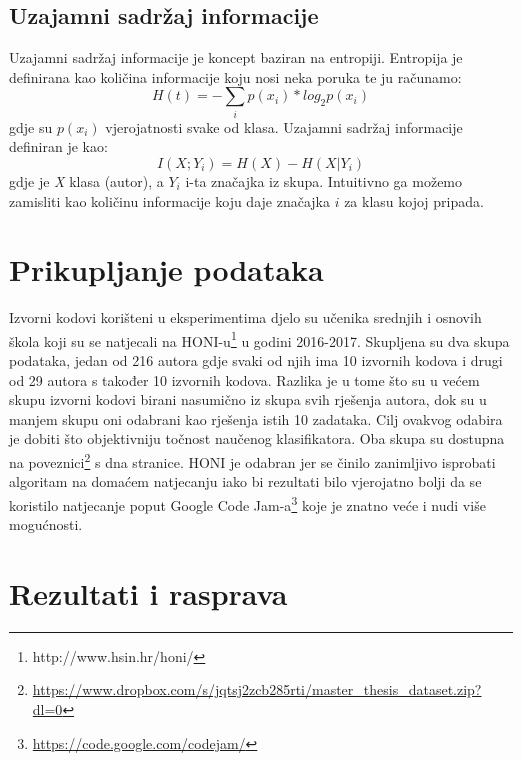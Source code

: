 \subsection{Uzajamni sadržaj informacije} \label{entropy}

Uzajamni sadržaj informacije je koncept baziran na entropiji. Entropija je definirana kao količina informacije koju nosi neka poruka te ju računamo:
\begin{equation}
		H(t) = - \sum_{i} p(x_{i}) * log_2 p(x_{i})
\end{equation}
gdje su $p(x_{i})$ vjerojatnosti svake od klasa. \newline
Uzajamni sadržaj informacije definiran je kao:
\begin{equation}
		I(X;Y_{i}) = H(X) - H(X | Y_{i})
\end{equation}
gdje je \textit{X} klasa (autor), a $Y_{i}$ i-ta značajka iz skupa. Intuitivno ga možemo zamisliti kao količinu informacije koju daje značajka $i$ za klasu kojoj pripada.

\section{Prikupljanje podataka}
Izvorni kodovi korišteni u eksperimentima djelo su učenika srednjih i osnovih škola koji su se natjecali na HONI-u\footnote{http://www.hsin.hr/honi/} u godini 2016-2017. Skupljena su dva skupa podataka, jedan od 216 autora gdje svaki od njih ima 10 izvornih kodova i drugi od 29 autora s također 10 izvornih kodova. Razlika je u tome što su u većem skupu izvorni kodovi birani nasumično iz skupa svih rješenja autora, dok su u manjem skupu oni odabrani kao rješenja istih 10 zadataka. Cilj ovakvog odabira  je dobiti što objektivniju točnost naučenog klasifikatora. Oba skupa su dostupna na poveznici\footnote{\url{https://www.dropbox.com/s/jqtsj2zcb285rti/master_thesis_dataset.zip?dl=0}} s dna stranice. HONI je odabran jer se činilo zanimljivo isprobati algoritam na domaćem natjecanju iako bi rezultati bilo vjerojatno bolji da se koristilo natjecanje poput Google Code Jam-a\footnote{\url{https://code.google.com/codejam/}} koje je znatno veće i nudi više mogućnosti. 

\section{Rezultati i rasprava} \label{results}

